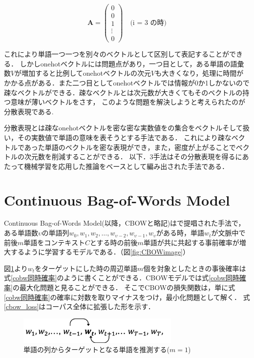 \documentclass[a4j,11pt,report]{jsbook}
\begin{document}
\begin{equation}
  \label{onehot}
  \bm{A} = \left(
  \begin{array}{c}
    0 \\
    0 \\
    1 \\
    \vdots \\
    0
  \end{array}
  \right)
  \quad \text{(i = 3 の時)}
\end{equation}


これにより単語一つ一つを別々のベクトルとして区別して表記することができる．
しかしonehotベクトルには問題点があり，一つ目として，ある単語の語彙数$V$が増加すると比例してonehotベクトルの次元$V$も大きくなり，処理に時間がかかる点がある．また二つ目としてonehotベクトルでは情報が0か1しかないので疎なベクトルができる．疎なベクトルとは次元数が大きくてもそのベクトルの持つ意味が薄いベクトルをさす，
このような問題を解決しようと考えられたのが分散表現である.

分散表現とは疎なonehotベクトルを密な密な実数値をの集合をベクトルそして扱い，その実数値で単語の意味を表そうとする手法である．
これにより疎なベクトルであった単語のベクトルを密な表現ができ，また，密度が上がることでベクトルの次元数を削減することができる．
以下．3手法はその分散表現を得るにあたって機械学習を応用した推論をベースとして編み出された手法である．

\clearpage
\section{Continuous Bag-of-Words Model\label{sec:CBOW}}
Continuous Bag-of-Words Model(以降，CBOWと略記)は\cite{SkipCBOW}で提唱された手法で，
ある単語数$\upsilon$の単語列$w_{0},w_{1},w_{2},\dots,w_{\upsilon-2},w_{\upsilon-1},w_{\upsilon}$がある時，単語$w_{t}$が文脈中で前後$m$単語をコンテキスト$C$とする時の前後$m$単語が共に共起する事前確率が増大するように学習するモデルである．（図\ref{fig:CBOWimage}）


図\ref{fig:CBOWformula}より$w_{t}$をターゲットにした時の周辺単語$m$個を対象としたときの事後確率は式\ref{cobw同時確率}のように書くことができる．CBOWモデルでは式\ref{cobw同時確率}の最大化問題と見ることができる．
そこでCBOWの損失関数は，単に式\ref{cobw同時確率}の確率に対数を取りマイナスをつけ，最小化問題として解く．
式\ref{cbow_loss}はコーパス全体に拡張した形を示す．



\begin{figure}[H]
 \centering
\includegraphics[width = 80mm]{image/cbow_w1w2wt-1wtwt+1.png}
 \caption{単語の列からターゲットとなる単語を推測する($m = 1$)}
 \label{fig:CBOWformula}
\end{figure}
\end{document}

